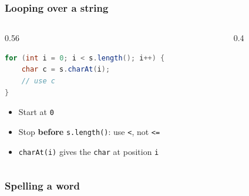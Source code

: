 \documentclass[aspectratio=169,10pt,compress]{beamer}
\begin{document}
\begin{frame}[t,fragile] \frametitle{Looping over a string}
  \begin{columns}[T]
    \begin{column}{0.56\textwidth}


\begin{lstlisting}[style=codesnippet, language=Java]
for (int i = 0; i < s.length(); i++) {
    char c = s.charAt(i);
    // use c
}
\end{lstlisting}



      \begin{itemize}\small
        \item Start at \texttt{0}
        \item Stop \textbf{before} \texttt{s.length()}: use \texttt{<}, not \texttt{<=}
        \item \texttt{charAt(i)} gives the \texttt{char} at position \texttt{i}
      \end{itemize}
    \end{column}
    \begin{column}{0.4\textwidth}
      \begin{center}
      \end{center}
    \end{column}
  \end{columns}
\end{frame}




\begin{frame}[t,fragile] \frametitle{Spelling a word}
\end{frame}
\end{document}
